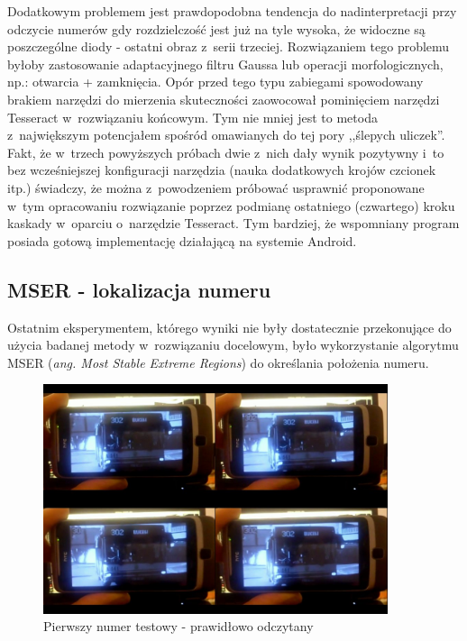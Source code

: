 Dodatkowym problemem jest prawdopodobna tendencja do nadinterpretacji
przy odczycie numerów gdy rozdzielczość jest już na tyle wysoka, że
widoczne są poszczególne diody - ostatni obraz z~serii trzeciej.
Rozwiązaniem tego problemu byłoby zastosowanie adaptacyjnego filtru
Gaussa lub operacji morfologicznych, np.: otwarcia + zamknięcia.
Opór przed tego typu zabiegami spowodowany brakiem narzędzi 
do mierzenia skuteczności zaowocował pominięciem narzędzi Tesseract
w~rozwiązaniu końcowym. Tym nie mniej jest to metoda z~największym
potencjałem spośród omawianych do tej pory ,,ślepych uliczek''. 
Fakt, że w~trzech powyższych próbach dwie z~nich dały wynik pozytywny
i~to bez wcześniejszej konfiguracji narzędzia (nauka dodatkowych
krojów czcionek itp.) świadczy, że można z~powodzeniem próbować
usprawnić proponowane w~tym opracowaniu rozwiązanie poprzez 
podmianę ostatniego (czwartego) kroku kaskady w~oparciu o~narzędzie
Tesseract. Tym bardziej, że wspomniany program posiada gotową
implementację działającą na systemie Android.

\subsection{MSER - lokalizacja numeru}

Ostatnim eksperymentem, którego wyniki nie były dostatecznie przekonujące
do użycia badanej metody w~rozwiązaniu docelowym, było
wykorzystanie algorytmu MSER (\textit{ang. Most Stable Extreme Regions})
do określania położenia numeru.

\begin{figure}[h!]
    \centering
    \includegraphics[width=0.9\textwidth]{img/exp_mser_concerns}
    \caption{Pierwszy numer testowy - prawidłowo odczytany}
    \label{fig:mser_example_results}
\end{figure}


